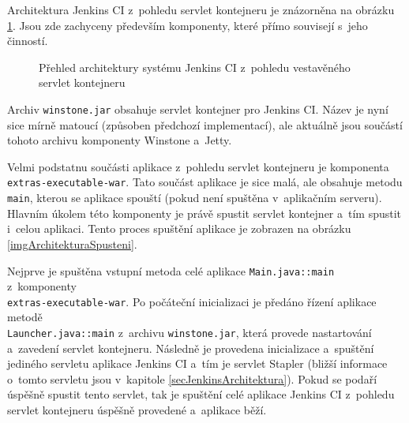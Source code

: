             Architektura Jenkins CI z~pohledu servlet kontejneru je znázorněna na obrázku \ref{imgArchitekturaServlet}.
            Jsou zde zachyceny především komponenty, které přímo souvisejí s~jeho činností.

            \begin{figure}[h!t]
                \begin{center}
                    \caption{Přehled architektury systému Jenkins CI z~pohledu vestavěného servlet kontejneru}
                    \label{imgArchitekturaServlet}
                \end{center}
            \end{figure}

            
            Archiv \texttt{winstone.jar} obsahuje servlet kontejner pro Jenkins CI. Název je nyní sice mírně matoucí
            (způsoben předchozí implementací), ale aktuálně jsou součástí tohoto archivu komponenty Winstone a~Jetty.

            Velmi podstatnu součásti aplikace z~pohledu servlet kontejneru je komponenta\\\texttt{extras-executable-war}. 
            Tato součást aplikace je sice malá, ale obsahuje metodu \texttt{main}, kterou se aplikace spouští 
            (pokud není spuštěna v~aplikačním serveru). Hlavním úkolem této komponenty je právě spustit 
            servlet kontejner a~tím spustit i~celou aplikaci. Tento proces spuštění aplikace je zobrazen
            na obrázku \ref{imgArchitekturaSpusteni}.

            Nejprve je spuštěna vstupní metoda celé aplikace \texttt{Main.java::main} z~komponenty\\\texttt{extras-executable-war}.
            Po počáteční inicializaci je předáno řízení aplikace metodě \\\texttt{Launcher.java::main}
            z~archivu \texttt{winstone.jar}, která provede nastartování
            a~zavedení servlet kontejneru. Následně je provedena inicializace a~spuštění
            jediného servletu aplikace Jenkins CI a~tím je servlet Stapler (bližší informace o~tomto
            servletu jsou v~kapitole \ref{secJenkinsArchitektura}). 
            Pokud se podaří úspěšně spustit tento servlet, tak je spuštění celé aplikace Jenkins CI z~pohledu
            servlet kontejneru úspěšně provedené a~aplikace běží.

